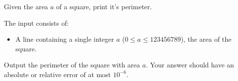 \problemname{\problemyamlname}


\newcommand{\maxa}{123456789}

Given the area $a$ of a square, print it's perimeter.

\begin{Input}
	The input consists of:
	\begin{itemize}
		\item A line containing a single integer $a$ ($0\leq a\leq \maxa$), the area of the square.
	\end{itemize}
\end{Input}

\begin{Output}
	Output the perimeter of the square with area $a$.
	Your answer should have an absolute or relative error of at most $10^{-6}$.
\end{Output}

